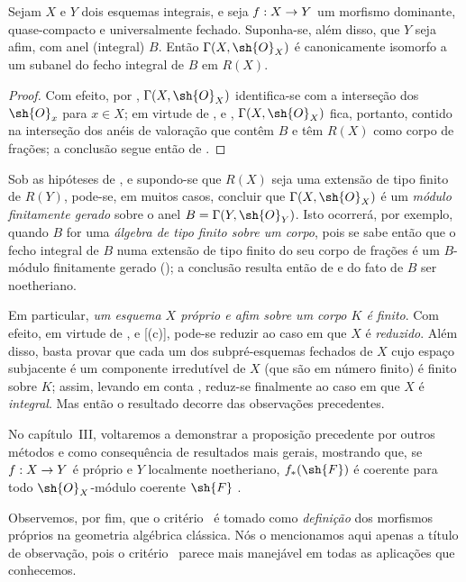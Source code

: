 \documentclass[oneside,10pt]{amsart}
\makeatletter
\newcommand{\ega@arrow}[2]{\mathchoice{#1}{#2}{#2}{#2}}
\renewcommand{\to}{\ega@arrow{\longrightarrow}{\rightarrow}}
\let\EGAOriginalLabel\label
\renewcommand{\label}[1]{\phantomsection\EGAOriginalLabel{#1}}
\makeatother
\begin{document}
\begin{corollary}[7.3.11]
\label{II.7.3.11}
Sejam $X$ e $Y$ dois esquemas integrais, e seja $f:X\to Y$ um morfismo dominante, quase-compacto e universalmente fechado.
Suponha-se, além disso, que $Y$ seja afim, com anel (integral) $B$.
Então $\Gamma(X,\sh{O}_X)$ é canonicamente isomorfo a um subanel do fecho integral de $B$ em $R(X)$.
\end{corollary}

\begin{proof}
Com efeito, por , $\Gamma(X,\sh{O}_X)$ identifica-se com a interseção dos $\sh{O}_x$ para $x\in X$;
em virtude de ,  e , $\Gamma(X,\sh{O}_X)$ fica, portanto, contido na interseção dos anéis de valoração que contêm $B$ e têm $R(X)$ como corpo de frações;
a conclusão segue então de .
\end{proof}

\begin{remarks}[7.3.12]
\label{II.7.3.12}
Sob as hipóteses de , e supondo-se que $R(X)$ seja uma extensão de tipo finito de $R(Y)$, pode-se, em muitos casos, concluir que $\Gamma(X,\sh{O}_X)$ é um \emph{módulo finitamente gerado} sobre o anel $B=\Gamma(Y,\sh{O}_Y)$.
Isto ocorrerá, por exemplo, quando $B$ for uma \emph{álgebra de tipo finito sobre um corpo}, pois se sabe então que o fecho integral de $B$ numa extensão de tipo finito do seu corpo de frações é um $B$-módulo finitamente gerado (\cite[t.~I, p.~267, th.~9]{I-13});
a conclusão resulta então de  e do fato de $B$ ser noetheriano.

Em particular, \emph{um esquema $X$ próprio e afim sobre um corpo $K$ é finito}.
Com efeito, em virtude de ,  e [(c)], pode-se reduzir ao caso em que $X$ é \emph{reduzido}.
Além disso, basta provar que cada um dos subpré-esquemas fechados de $X$ cujo espaço subjacente é um componente irredutível de $X$ (que são em número finito) é finito sobre $K$; assim, levando em conta , reduz-se finalmente ao caso em que $X$ é \emph{integral}.
Mas então o resultado decorre das observações precedentes.

No capítulo~III, voltaremos a demonstrar a proposição precedente por outros métodos e como consequência de resultados mais gerais, mostrando que, se $f:X\to Y$ é próprio e $Y$ localmente noetheriano, $f_*(\sh{F})$ é coerente para todo $\sh{O}_X$-módulo coerente $\sh{F}$ .

Observemos, por fim, que o critério~ é tomado como \emph{definição} dos morfismos próprios na geometria algébrica clássica.
Nós o mencionamos aqui apenas a título de observação, pois o critério~ parece mais manejável em todas as aplicações que conhecemos.
\end{remarks}
\end{document}
